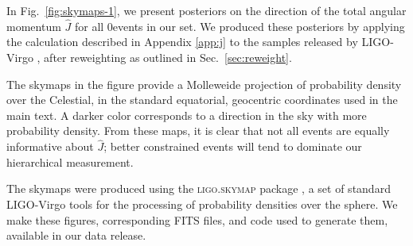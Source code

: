 \documentclass[aps,prd,twocolumn,superscriptaddress,preprintnumbers,floatfix,nofootinbib]{revtex4-2}
\newcommand{\Nevents}{0}
\begin{document}
In Fig.~\ref{fig:skymaps-1}, we present posteriors on the direction of the total angular momentum $\hat{J}$ for all \Nevents events in our set.
We produced these posteriors by applying the calculation described in Appendix \ref{app:j} to the samples released by LIGO-Virgo \cite{zenodo:GWTC-2.1,zenodo:GWTC-3}, after reweighting as outlined in Sec.~\ref{sec:reweight}.

The skymaps in the figure provide a Molleweide projection of probability density over the Celestial, in the standard equatorial, geocentric coordinates used in the main text.
A darker color corresponds to a direction in the sky with more probability density.
From these maps, it is clear that not all events are equally informative about $\hat{J}$; better constrained events will tend to dominate our hierarchical measurement.

The skymaps were produced using the \textsc{ligo.skymap} package \cite{skymap,Singer:2016eax,Singer:2016erz}, a set of standard LIGO-Virgo tools for the processing of probability densities over the sphere.
We make these figures,  corresponding \ac{FITS} files, and code used to generate them, available in our data release.



\end{document}
